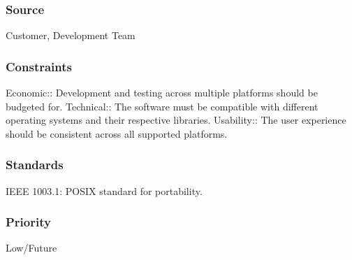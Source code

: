 \subsubsection{Source}
Customer, Development Team
\subsubsection{Constraints}
Economic:: Development and testing across multiple platforms should be budgeted for.
Technical:: The software must be compatible with different operating systems and their respective libraries.
Usability:: The user experience should be consistent across all supported platforms.
\subsubsection{Standards}
IEEE 1003.1: POSIX standard for portability.
\subsubsection{Priority}
Low/Future
